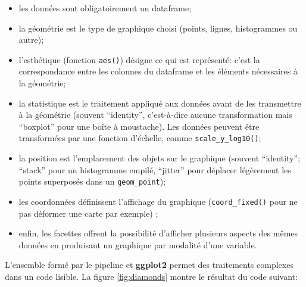 \documentclass[
  12pt,
  french,
  a4paper,
  extrafontsizes,onecolumn,openright
  ]{memoir}
\newenvironment{Shaded}{\begin{snugshade}}{\end{snugshade}}
\newcommand{\CommentTok}[1]{\textcolor[rgb]{0.56,0.35,0.01}{\textit{#1}}}
\newcommand{\DataTypeTok}[1]{\textcolor[rgb]{0.13,0.29,0.53}{#1}}
\newcommand{\FloatTok}[1]{\textcolor[rgb]{0.00,0.00,0.81}{#1}}
\newcommand{\KeywordTok}[1]{\textcolor[rgb]{0.13,0.29,0.53}{\textbf{#1}}}
\newcommand{\NormalTok}[1]{#1}
\newcommand{\OperatorTok}[1]{\textcolor[rgb]{0.81,0.36,0.00}{\textbf{#1}}}
\newcommand{\StringTok}[1]{\textcolor[rgb]{0.31,0.60,0.02}{#1}}
\providecommand{\tightlist}{%
  \setlength{\itemsep}{0pt}\setlength{\parskip}{0pt}}
\begin{document}
\begin{itemize}
\tightlist
\item
  les données sont obligatoirement un dataframe;
\item
  la géométrie est le type de graphique choisi (points, lignes, histogrammes ou autre);
\item
  l'esthétique (fonction \texttt{aes()}) désigne ce qui est représenté: c'est la correspondance entre les colonnes du dataframe et les éléments nécessaires à la géométrie;
\item
  la statistique est le traitement appliqué aux données avant de les transmettre à la géométrie (souvent \enquote{identity}, c'est-à-dire aucune transformation mais \enquote{boxplot} pour une boîte à moustache).
  Les données peuvent être transformées par une fonction d'échelle, comme \texttt{scale\_y\_log10()};
\item
  la position est l'emplacement des objets sur le graphique (souvent \enquote{identity}; \enquote{stack} pour un histogramme empilé, \enquote{jitter} pour déplacer légèrement les points superposés dans un \texttt{geom\_point});
\item
  les coordonnées définissent l'affichage du graphique (\texttt{coord\_fixed()} pour ne pas déformer une carte par exemple) ;
\item
  enfin, les facettes offrent la possibilité d'afficher plusieurs aspects des mêmes données en produisant un graphique par modalité d'une variable.
\end{itemize}

L'ensemble formé par le pipeline et \textbf{ggplot2} permet des traitements complexes dans un code lisible.
La figure \ref{fig:diamonds} montre le résultat du code suivant:



\scriptsize

\begin{Shaded}
\end{Shaded}
\end{document}
